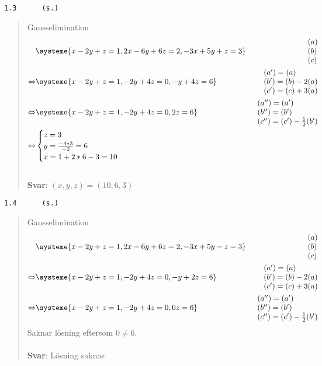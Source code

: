 \documentclass[a4paper]{article}
\newcommand{\tskcol}[1]{\textcolor{tskcol}{#1}}
\begin{document}
\pagebreak
\texttt{\tskcol{1.3~~~~~ (s.)}}
\begin{quotation}
	\noindent
	Gausselimination
	\begin{align*}
		&\systeme{
			  x-2y+ z=1,
			 2x-6y+6z=2,
			-3x+5y+ z=3}  
		&\begin{array}{l} 
			(a) \\ 
			(b) \\
			(c)
		\end{array} \\ \Leftrightarrow
		&\systeme{
			x-2y+ z=1,
			 -2y+4z=0,
			 - y+4z=6}  
		&\begin{array}{l} 
			(a')=(a) \\ 
			(b')=(b)-2(a) \\
			(c')=(c)+3(a)
		\end{array} \\ \Leftrightarrow
		&\systeme{
			x-2y+ z=1,
			 -2y+4z=0,
			     2z=6}  
		&\begin{array}{l} 
			(a'')=(a') \\ 
			(b'')=(b') \\
			(c'')=(c')-\frac{1}{2}(b')
		\end{array} \\ \Leftrightarrow
		&\begin{cases}
			z=3 \\
			y=\frac{-4*3}{-2} =6\\
			x=1+2*6-3=10
		\end{cases}
	\end{align*}
	\\
	\textbf{Svar}: $(x,y,z)=(10,6,3)$
\end{quotation}

\texttt{\tskcol{1.4~~~~~ (s.)}}
\begin{quotation}
	\noindent
	Gausselimination
	\begin{align*}
	&\systeme{
		  x-2y+ z=1,
		 2x-6y+6z=2,
		-3x+5y- z=3}  
	&\begin{array}{l} 
	(a) \\ 
	(b) \\
	(c)
	\end{array} \\ \Leftrightarrow
	&\systeme{
		x-2y+ z=1,
		 -2y+4z=0,
		 - y+2z=6}  
	&\begin{array}{l} 
	(a')=(a) \\ 
	(b')=(b)-2(a) \\
	(c')=(c)+3(a)
	\end{array} \\ \Leftrightarrow
	&\systeme{
		x-2y+ z=1,
		 -2y+4z=0,
		      0z=6}  
	&\begin{array}{l} 
	(a'')=(a') \\ 
	(b'')=(b') \\
	(c'')=(c')-\frac{1}{2}(b')
	\end{array}
	\end{align*}
	Saknar lösning eftersom $0\neq6$.
	\\ \\
	\textbf{Svar}: Lösning saknas
\end{quotation}
\end{document}

